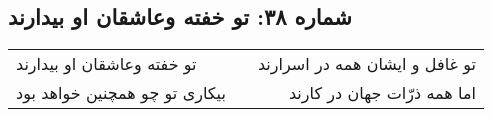 \begin{center}
\section*{شماره ۳۸: تو خفته وعاشقان او بیدارند}
\label{sec:038}
\begin{longtable}{l p{0.5cm} r}
تو خفته وعاشقان او بیدارند
&&
تو غافل و ایشان همه در اسرارند
\\
بیکاری تو چو همچنین خواهد بود
&&
اما همه ذرّات جهان در کارند
\\
\end{longtable}
\end{center}
